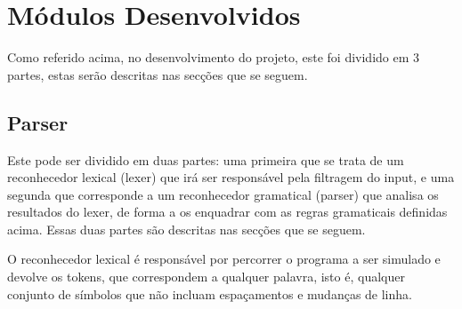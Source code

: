 \documentclass{report}
\begin{document}
\noindent
\par
\begin{Parallel}[v]{0.48\textwidth}{0.48\textwidth}
\ParallelPar
\end{Parallel}

\section{Módulos Desenvolvidos}

Como referido acima, no desenvolvimento do projeto, este foi dividido em 3 partes, estas serão descritas nas secções que se seguem.

\subsection{Parser}

 Este pode ser dividido em duas partes:
  uma primeira que se trata de um reconhecedor lexical (lexer) que irá ser responsável pela filtragem do input,
	 e uma segunda que corresponde a um reconhecedor gramatical (parser) que analisa os resultados do lexer,
	 de forma a os enquadrar com as regras gramaticais definidas acima. Essas duas partes são descritas
	  nas secções que se seguem.

O reconhecedor lexical é responsável por percorrer o programa a ser simulado e devolve os tokens, que correspondem a qualquer palavra,
 isto é, qualquer conjunto de símbolos que não incluam espaçamentos e mudanças de linha.
\end{document}
